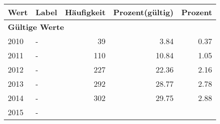      \begin{longtable}{lXrrr}
     \toprule
     \textbf{Wert} & \textbf{Label} & \textbf{Häufigkeit} & \textbf{Prozent(gültig)} & \textbf{Prozent} \\
     \endhead
     \midrule
     \multicolumn{5}{l}{\textbf{Gültige Werte}}\\

     2010 &
     \multicolumn{1}{X}{ -  } &


       \num{39} &
       \num[round-mode=places,round-precision=2]{3,84} &
         \num[round-mode=places,round-precision=2]{0,37} \\

     2011 &
     \multicolumn{1}{X}{ -  } &


       \num{110} &
       \num[round-mode=places,round-precision=2]{10,84} &
         \num[round-mode=places,round-precision=2]{1,05} \\

     2012 &
     \multicolumn{1}{X}{ -  } &


       \num{227} &
       \num[round-mode=places,round-precision=2]{22,36} &
         \num[round-mode=places,round-precision=2]{2,16} \\

     2013 &
     \multicolumn{1}{X}{ -  } &


       \num{292} &
       \num[round-mode=places,round-precision=2]{28,77} &
         \num[round-mode=places,round-precision=2]{2,78} \\

     2014 &
     \multicolumn{1}{X}{ -  } &


       \num{302} &
       \num[round-mode=places,round-precision=2]{29,75} &
         \num[round-mode=places,round-precision=2]{2,88} \\

     2015 &
     \multicolumn{1}{X}{ -  } &



\end{longtable}
